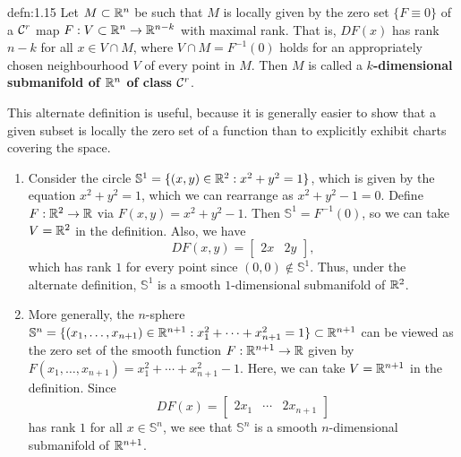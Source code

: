 \begin{defn}{defn:1.15}
    Let $M \subset \mathbb{R}^n$ be such that $M$ is locally given by the zero set 
    $\{F \equiv 0\}$ of a ${\cal C}^r$ map $F : V \subset \mathbb{R}^n \to \mathbb{R}^{n-k}$ 
    with maximal rank. That is, 
    $DF(x)$ has rank $n - k$ for all $x \in V \cap M$, where $V \cap M 
    = F^{-1}(0)$ holds for an appropriately chosen neighbourhood $V$ 
    of every point in $M$. Then $M$ is called a 
    {\bf $k$-dimensional submanifold of $\mathbb{R}^n$ of class ${\cal C}^r$}.
\end{defn}\vspace{-0.25cm} 
This alternate definition is useful, because it is generally easier to show 
that a given subset is locally the zero set of a function than to 
explicitly exhibit charts covering the space. 
\begin{enumerate}[(1)]
    \item Consider the circle $\mathbb{S}^1 = \{(x, y) \in \mathbb{R}^2 : x^2 + y^2 = 1\}$, 
    which is given by the equation $x^2 + y^2 = 1$, which we can rearrange as 
    $x^2 + y^2 - 1 = 0$.
    Define $F : \mathbb{R}^2 \to \mathbb{R}$ via $F(x, y) = x^2 + y^2 - 1$. Then $\mathbb{S}^1 
    = F^{-1}(0)$, so we can take $V = \mathbb{R}^2$ in the definition. Also, we have 
    \[ DF(x, y) = \begin{bmatrix}
        2x & 2y 
    \end{bmatrix}, \] 
    which has rank $1$ for every point since $(0, 0) \notin \mathbb{S}^1$. 
    Thus, under the alternate definition, $\mathbb{S}^1$ is a smooth $1$-dimensional
    submanifold of $\mathbb{R}^2$. 

    \item More generally, the $n$-sphere $\mathbb{S}^n = \{(x_1, \dots, 
    x_{n+1}) \in \mathbb{R}^{n+1} : x_1^2 + \cdots + x_{n+1}^2 = 1\} \subset \mathbb{R}^{n+1}$ 
    can be viewed as the zero set of the smooth function $F : \mathbb{R}^{n+1} \to \mathbb{R}$ 
    given by $F(x_1, \dots, x_{n+1}) = x_1^2 + \cdots + x_{n+1}^2 - 1$. 
    Here, we can take $V = \mathbb{R}^{n+1}$ in the definition. Since 
    \[ DF(x) = \begin{bmatrix} 2x_1 & \cdots & 2x_{n+1} \end{bmatrix} \] 
    has rank $1$ for all $x \in \mathbb{S}^n$, we see that $\mathbb{S}^n$ 
    is a smooth $n$-dimensional submanifold of $\mathbb{R}^{n+1}$. 


\end{enumerate}
